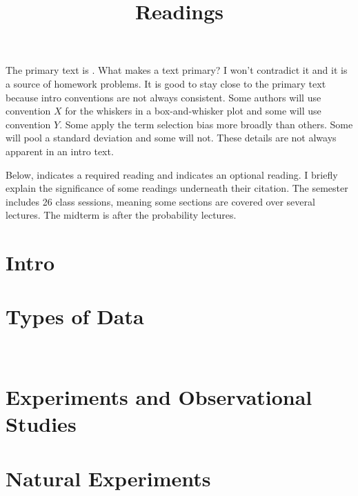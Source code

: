 \documentclass[12pt]{article}
\title{Readings \\ \scalebox{0.6}{Stats 1101 \semester} } %
\date{}
\begin{document}
\maketitle


The primary text is \cite{freedman2007statistics}. What makes a text primary? I won't contradict it and it is a source of homework problems. It is good to stay close to the primary text because intro conventions are not always consistent. Some authors will use convention $X$ for the whiskers in a box-and-whisker plot and some will use convention $Y$. Some apply the term selection bias more broadly than others. Some will pool a standard deviation and some will not. These details are not always apparent in an intro text. 

Below, \scalebox{0.6}{\faToggleOn} indicates a required reading and \scalebox{0.6}{\faToggleOff} indicates an optional reading. I briefly explain the significance of some readings underneath their citation. The semester includes 26 class sessions, meaning some sections are covered over several lectures. The midterm is after the probability lectures.

\section{Intro}



\section{Types of Data}

 \\


\section{Experiments and Observational Studies}


\section{Natural Experiments}
\end{document}
